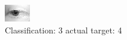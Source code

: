 \begin{figure}[h!]
\begin{center}
\includegraphics[width=0.60\columnwidth]{figures/ID2561_class_3_target_4.png}
\end{center}
\caption{ Classification: 3 actual target: 4}
\label{fig:ID2561_class_3_target_4}
\end{figure}

